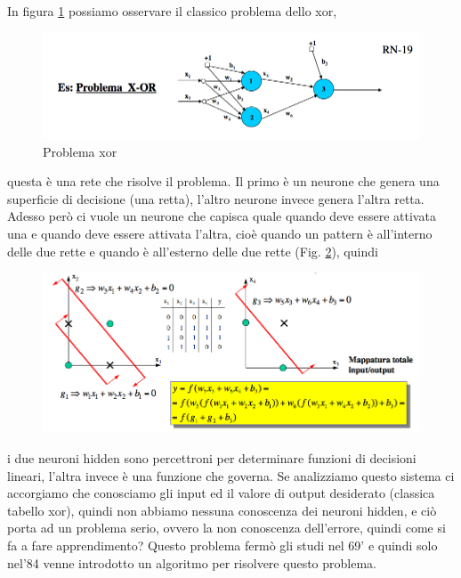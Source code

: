 \noindent In figura \ref{xor1} possiamo osservare il classico problema dello xor,  
\begin{figure}
\centering
\includegraphics[scale=0.5]{img/xor1.png}
\caption{Problema xor}
\label{xor1}
\end{figure}
questa è una rete che risolve il problema. Il primo è un neurone che genera una superficie di decisione (una retta), l'altro neurone invece genera l'altra retta. Adesso però ci vuole un neurone che capisca quale  quando deve essere attivata una e quando deve essere attivata l'altra, cioè quando un pattern è all'interno delle due rette e quando è all'esterno delle due rette (Fig. \ref{xor2}), quindi 
\begin{figure}
\centering
\includegraphics[scale=0.5]{img/xor2.png}
\label{xor2}
\end{figure}
i due neuroni hidden sono percettroni per determinare funzioni di decisioni lineari, l'altra invece è una funzione che governa. Se analizziamo questo sistema ci accorgiamo che conosciamo gli input ed il valore di output desiderato (classica tabello xor), quindi non abbiamo nessuna conoscenza dei neuroni hidden, e ciò porta ad un problema serio, ovvero la non conoscenza dell'errore, quindi come si fa a fare apprendimento? Questo problema fermò gli studi nel 69' e quindi solo nel'84 venne introdotto un algoritmo per risolvere questo problema.\\

